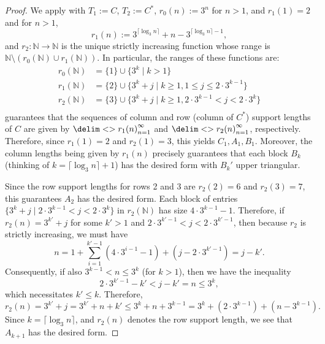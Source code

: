 \documentclass[10pt,reqno]{amsart}
\theoremstyle{remark}
\newcommand{\seq}{\delim<>}
\numberwithin{equation}{section}
\begin{document}
\begin{proof}
  We apply  with $T_1 := C$, $T_2 := C^{*}$, $r_0(n) := 3^n$ for $n > 1$, and $r_1(1) = 2$ and for $n > 1$,
  \begin{equation*}
    r_1(n) := 3^{\lceil \log_3 n \rceil} + n - 3^{\lceil \log_3 n \rceil - 1},
  \end{equation*}
  and $r_2 : \mathbb{N} \to \mathbb{N}$ is the unique strictly increasing function whose range is $\mathbb{N} \setminus (r_0(\mathbb{N}) \cup r_1(\mathbb{N}))$.
  In particular, the ranges of these functions are:
  \begin{align*}
    r_0(\mathbb{N}) &= \{ 1 \} \cup \{ 3^k \mid k > 1 \} \\
    r_1(\mathbb{N}) &= \{ 2 \} \cup \{ 3^k + j \mid k \ge 1, 1 \le j \le 2 \cdot 3^{k-1} \} \\
    r_2(\mathbb{N}) &= \{ 3 \} \cup \{ 3^k + j \mid k \ge 1, 2 \cdot 3^{k-1} < j < 2 \cdot 3^k \} \\
  \end{align*}
   guarantees that the sequences of column and row (column of $C^{*}$) support lengths of $C$ are given by $\seq{r_1(n)}_{n=1}^{\infty}$ and $\seq{r_2(n)}_{n=1}^{\infty}$, respectively.
  Therefore, since $r_1(1) = 2$ and $r_2(1) = 3$, this yields $C_1,A_1,B_1$.
  Moreover, the column lengths being given by $r_1(n)$ precisely guarantees that each block $B_k$ (thinking of $k = \lceil \log_3 n \rceil + 1$) has the desired form with $B_k'$ upper triangular.

  Since the row support lengths for rows 2 and 3 are $r_2(2) = 6$ and $r_2(3) = 7$, this guarantees $A_2$ has the desired form.
  Each block of entries $\{ 3^k + j \mid 2 \cdot 3^{k-1} < j < 2 \cdot 3^k \}$ in $r_2(\mathbb{N})$ has size $4 \cdot 3^{k-1} - 1$.
  Therefore, if $r_2(n) = 3^{k'} + j$ for some $k' > 1$ and $2 \cdot 3^{k'-1} < j < 2 \cdot 3^{k'-1}$, then because $r_2$ is strictly increasing, we must have
  \begin{equation*}
    n = 1 + \sum_{i=1}^{k'-1} (4 \cdot 3^{i-1} - 1) + (j - 2 \cdot 3^{k'-1}) = j - k'.
  \end{equation*}
  Consequently, if also $3^{k-1} < n \le 3^k$ (for $k > 1$), then we have the inequality
  \begin{equation*}
    2 \cdot 3^{k'-1} - k' < j - k' = n \le 3^k,
  \end{equation*}
  which necessitates $k' \le k$.
  Therefore,
  \begin{equation*}
    r_2(n) = 3^{k'} + j = 3^{k'} + n + k' \le 3^k + n + 3^{k-1} = 3^k + (2 \cdot 3^{k-1}) + (n - 3^{k-1}).
  \end{equation*}
  Since $k = \lceil \log_3 n \rceil$, and $r_2(n)$ denotes the row support length, we see that $A_{k+1}$ has the desired form.
\end{proof}
\end{document}
